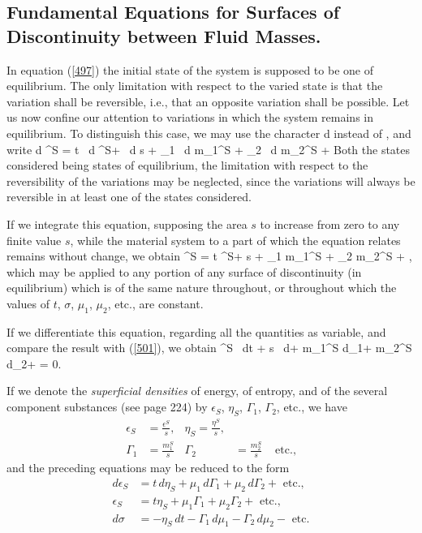 \documentclass[12pt]{article}
\begin{document}
{\subsection{Fundamental Equations for Surfaces of Discontinuity between Fluid Masses.}
In equation (\ref{497}) the initial state of the system is supposed to be one of equilibrium. The only limitation with respect to the varied state is that the variation shall be reversible, i.e., that an opposite variation shall be possible. Let us now confine our attention to variations in which the system remains in equilibrium. To distinguish this case, we may use the character d instead of , and write
\eqs d \epsilon^S = t \, d \eta^S+ \sigma \, d s + \mu_1 \, d m_1^S + \mu_2 \, d m_2^S +  \label{501} \eqe
Both the states considered being states of equilibrium, the limitation with respect to the reversibility of the variations may be neglected, since the variations will always be reversible in at least one of the states considered.


If we integrate this equation, supposing the area $s$ to increase from zero to any finite value $s$, while the material system to a part of which the equation relates remains without change, we obtain
\eqs   \epsilon^S = t \eta^S+ \sigma s + \mu_1  m_1^S + \mu_2 m_2^S + ,\label{502} \eqe
which may be applied to any portion of any surface of discontinuity (in equilibrium) which is of the same nature throughout, or throughout which the values of $t$, $\sigma$, $\mu_1$, $\mu_2$, etc., are constant.


If we differentiate this equation, regarding all the quantities as
variable, and compare the result with (\ref{501}), we obtain
\eqs \eta^S \, dt + s \, d\sigma + m_1^S d\mu_1+ m_2^S d\mu_2+  = 0. \label{503} \eqe


If we denote the \textit{superficial densities} of energy, of entropy, and of the several component substances (see page 224) by $\epsilon_S$, $\eta_S$, $\Gamma_1$, $\Gamma_2$, etc., we have
\begin{align} \epsilon_S&=  \frac{\epsilon^S}{s},&    \eta_S=\frac{\eta^S}{s}, &  \label{504} \\
\Gamma_1 &= \frac{m_1^S}{s} & \Gamma_2 &= \frac{m_2^S}{s} & \text{ etc.},      \label{505}\end{align}
and the preceding equations may be reduced to the form
\begin{align}
d \epsilon_S &= t \, d \eta_S + \mu_1 \, d \Gamma_1 + \mu_2 \, d \Gamma_2+ \text{ etc.}, \label{506}\\
\epsilon_S &= t \eta_S + \mu_1 \Gamma_1 + \mu_2 \Gamma_2+ \text{ etc.}, \label{507}\\
d\sigma &= -\eta_S \, dt -\Gamma_1\,d \mu_1 -\Gamma_2\,d \mu_2- \text{ etc.}  \label{508} 
\end{align}

}
\end{document}
